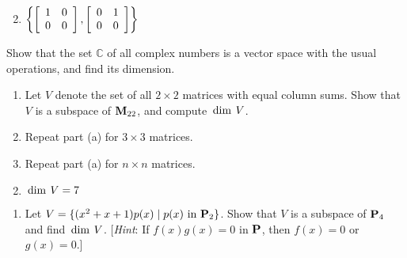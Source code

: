 \begin{multicols}{2}
\begin{ex}
\begin{enumerate}[label={\alph*.}]
\end{enumerate}
\begin{sol}
\begin{enumerate}[label={\alph*.}]
\setcounter{enumi}{1}
\item $\left\{
\left[ \begin{array}{rr}
1 & 0 \\
0 & 0
\end{array} \right]
, 
\left[ \begin{array}{rr}
0 & 1 \\
0 & 0
\end{array} \right]
\right\}$

\end{enumerate}
\end{sol}
\end{ex}

\begin{ex}
Show that the set $\mathbb{C}$  of all complex numbers is a vector space with the usual operations, and find its dimension.
\end{ex}

\columnbreak
\begin{ex}
\begin{enumerate}[label={\alph*.}]
\item Let $V$ denote the set of all $2 \times 2$ matrices with equal column sums. Show that $V$ is a subspace of $\textbf{M}_{22}$, and compute $\thinspace\operatorname{dim\medspace} V$.

\item Repeat part (a) for $3 \times 3$ matrices.

\item Repeat part (a) for $n \times n$ matrices.

\end{enumerate}
\begin{sol}
\begin{enumerate}[label={\alph*.}]
\setcounter{enumi}{1}
\item  $\thinspace\operatorname{dim\medspace} V = 7$

\end{enumerate}
\end{sol}
\end{ex}

\begin{ex}
\begin{enumerate}[label={\alph*.}]
\item Let $V = \{(x^{2} + x + 1)p(x) \mid p(x) \mbox{ in } \textbf{P}_{2}\}$. Show that $V$ is a subspace of $\textbf{P}_{4}$ and find $\thinspace\operatorname{dim\medspace} V$. [\textit{Hint}: If $f(x)g(x) = 0$ in $\textbf{P}$, then $f(x) = 0$ or $g(x) = 0$.]


\end{enumerate}
\end{ex}
\end{multicols}
